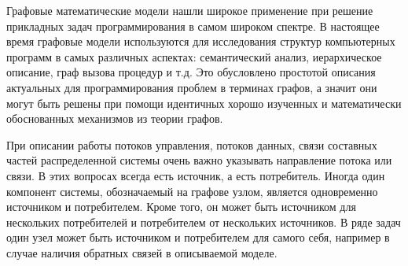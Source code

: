 




Графовые математические модели нашли широкое применение при решение прикладных задач программирования в самом широком спектре. В настоящее время графовые модели используются для исследования структур компьютерных программ в самых различных аспектах: семантический анализ, иерархическое описание, граф вызова процедур и т.д. Это обусловлено простотой описания актуальных для программирования проблем в терминах графов, а значит они могут быть решены при помощи идентичных хорошо изученных и математически обоснованных механизмов из теории графов.

При описании работы потоков управления, потоков данных, связи составных частей распределенной системы очень важно указывать направление потока или связи. В этих вопросах всегда есть источник, а есть потребитель. Иногда один компонент системы, обозначаемый на графове узлом, является одновременно источником и потребителем. Кроме того, он может быть источником для нескольких потребителей и потребителем от нескольких источников. В ряде задач один узел может быть источником и потребителем для самого себя, например в случае наличия обратных связей в описываемой моделе.


